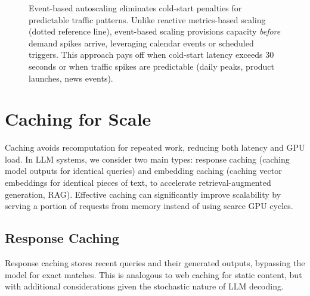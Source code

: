 \begin{figure}[t]
\begin{llmfigbox}
\end{llmfigbox}
\caption{Event-based autoscaling eliminates cold-start penalties for predictable traffic patterns. Unlike reactive metrics-based scaling (dotted reference line), event-based scaling provisions capacity \emph{before} demand spikes arrive, leveraging calendar events or scheduled triggers. This approach pays off when cold-start latency exceeds 30 seconds or when traffic spikes are predictable (daily peaks, product launches, news events).}
\label{fig:ch06_autoscale_event_based}
\end{figure}


\section{Caching for Scale}
\label{sec:caching}
Caching avoids recomputation for repeated work, reducing both latency and GPU load. In LLM systems, we consider two main types: response caching (caching model outputs for identical queries) and embedding caching (caching vector embeddings for identical pieces of text, to accelerate retrieval-augmented generation, \textsc{RAG}). Effective caching can significantly improve scalability by serving a portion of requests from memory instead of using scarce GPU cycles.

\subsection{Response Caching}
\label{sec:scaling-response-caching}
Response caching stores recent queries and their generated outputs, bypassing the model for exact matches. This is analogous to web caching for static content, but with additional considerations given the stochastic nature of LLM decoding.

